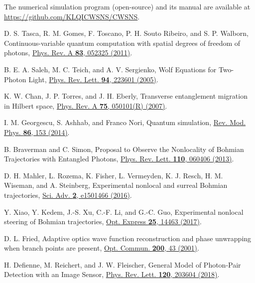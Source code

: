 \documentclass[pra,english,reprint,nofootinbib,aps,superscriptaddress,showpacs,showkeys]{revtex4-2}
\theoremstyle{definition}
\theoremstyle{remark}
\begin{document}
\begin{thebibliography}{99}
		The numerical simulation program (open-source) and its manual are available at \href{https://github.com/KLQICWSNS/CWSNS}{https://github.com/\hspace{0em}KLQICWSNS/\hspace{0em}CWSNS}.
		
		D. S. Tasca, R. M. Gomes, F. Toscano, P. H. Souto Ribeiro, and S. P. Walborn,
		Continuous-variable quantum computation with spatial degrees of freedom of photons,
		\href{https://doi.org/10.1103/PhysRevA.83.052325}{Phys. Rev. A \textbf{83}, 052325 (2011)}.
		
		B. E. A. Saleh, M. C. Teich, and A. V. Sergienko,
		Wolf Equations for Two-Photon Light,
		\href{https://doi.org/10.1103/PhysRevLett.94.223601}{Phys. Rev. Lett. \textbf{94}, 223601 (2005)}.
		
		K. W. Chan, J. P. Torres, and J. H. Eberly,
		Transverse entanglement migration in Hilbert space,
		\href{https://doi.org/10.1103/PhysRevA.75.050101}{Phys. Rev. A \textbf{75}, 050101(R) (2007)}.
		
		I. M. Georgescu, S. Ashhab, and Franco Nori,
		Quantum simulation,
		\href{https://doi.org/10.1103/RevModPhys.86.153}{Rev. Mod. Phys. \textbf{86}, 153 (2014)}.
		
		B. Braverman and C. Simon,
		Proposal to Observe the Nonlocality of Bohmian Trajectories with Entangled Photons,
		\href{https://doi.org/10.1103/PhysRevLett.110.060406}{Phys. Rev. Lett. \textbf{110}, 060406 (2013)}.
		
		D. H. Mahler, L. Rozema, K. Fisher, L. Vermeyden, K. J. Resch, H. M. Wiseman, and A. Steinberg,
		Experimental nonlocal and surreal Bohmian trajectories,
		\href{https://doi.org/10.1126/sciadv.1501466}{Sci. Adv. \textbf{2}, e1501466 (2016)}.
		
		Y. Xiao, Y. Kedem, J.-S. Xu, C.-F. Li, and G.-C. Guo,
		Experimental nonlocal steering of Bohmian trajectories,
		\href{https://doi.org/10.1364/OE.25.014463}{Opt. Express \textbf{25}, 14463 (2017)}.
		
		D. L. Fried,
		Adaptive optics wave function reconstruction and phase unwrapping when branch points are present,
		\href{https://doi.org/10.1016/S0030-4018(01)01546-2}{Opt. Commun. \textbf{200}, 43 (2001)}.
		
		H. Defienne, M. Reichert, and J. W. Fleischer,
		General Model of Photon-Pair Detection with an Image Sensor,
		\href{https://doi.org/10.1103/PhysRevLett.120.203604}{Phys. Rev. Lett. \textbf{120}, 203604 (2018)}.
		

\end{thebibliography}
\end{document}
